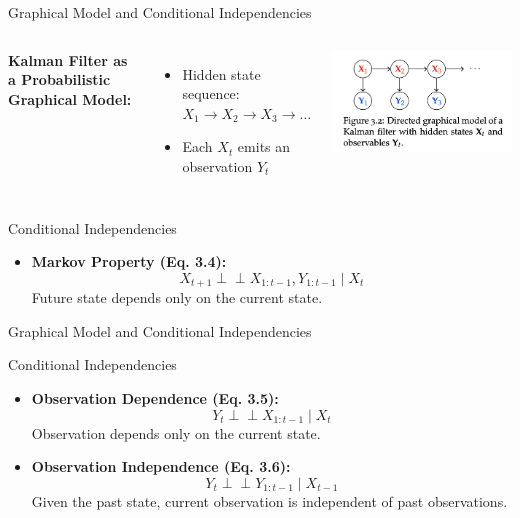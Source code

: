 \documentclass[handout,aspectratio=169]{beamer}
\begin{document}
\begin{frame}{Graphical Model and Conditional Independencies}

\begin{columns}
    \textbf{Kalman Filter as a Probabilistic Graphical Model:}
\begin{itemize}
  \item Hidden state sequence: \( X_1 \rightarrow X_2 \rightarrow X_3 \rightarrow \dots \)
  \item Each \( X_t \) emits an observation \( Y_t \)
\end{itemize}

    \includegraphics[width=\textwidth]{chapter_figs/02_figs/3_2.png} 
\end{columns}

\begin{block}{Conditional Independencies}
\begin{itemize}
  \item \textbf{Markov Property (Eq. 3.4):}
  \[
    X_{t+1} \perp \!\!\! \perp X_{1:t-1}, Y_{1:t-1} \mid X_t
  \]
  Future state depends only on the current state.
  \end{itemize}
\end{block}
\end{frame}

\begin{frame}{Graphical Model and Conditional Independencies}
\begin{block}{Conditional Independencies}
\begin{itemize}
  \item \textbf{Observation Dependence (Eq. 3.5):}
  \[
    Y_t \perp \!\!\! \perp X_{1:t-1} \mid X_t
  \]
  Observation depends only on the current state.

  \item \textbf{Observation Independence (Eq. 3.6):}
  \[
    Y_t \perp \!\!\! \perp Y_{1:t-1} \mid X_{t-1}
  \]
  Given the past state, current observation is independent of past observations.
\end{itemize}
\end{block}

\end{frame}
\end{document}
